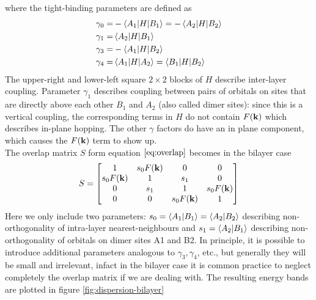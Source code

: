 where the tight-binding parameters are defined as 
\begin{equation}
    \begin{split}
        \gamma_0=&-\braket{A_1|H}{B_1}=-\braket{A_2|H}{B_2} \\
        \gamma_1=&\braket{A_2|H}{B_1}  \\
        \gamma_3=&-\braket{A_1|H}{B_2}  \\
        \gamma_4=& \braket{A_1|H}{A_2}=\braket{B_1|H}{B_2} \\
    \end{split}
\end{equation}
The upper-right and lower-left square $2\times 2$ blocks of $H$ describe inter-layer coupling. Parameter $\gamma_1$ describes coupling between pairs of orbitals on sites that are directly above each other $B_1$ and $A_2$ (also called dimer sites): since this is a vertical coupling, the corresponding terms in $H$ do not contain $F(\mathbf{k})$ which describes in-plane hopping. The other $\gamma$ factors do have an in plane component, which causes the $F(\mathbf{k})$ term to show up.\\
The overlap matrix $S$ form equation $\ref{eq:overlap}$ becomes in the bilayer case
\begin{equation}
    S=
    \begin{bmatrix}
        1 & s_0 F(\mathbf{k}) & 0&0\\
        s_0 F(\mathbf{k})  &1&s_1&0\\
        0&s_1&1&s_0 F(\mathbf{k})\\
        0&0&s_0 F(\mathbf{k}) &1
    \end{bmatrix}
\end{equation}
Here we only include two parameters: $s_0 = \braket{A_1}{B_1} = \braket{A_2}{B_2}$ describing non-orthogonality of intra-layer nearest-neighbours and $s_1= \braket{A_2}{B_1}$ describing non-orthogonality of orbitals on dimer sites A1 and B2. In principle, it is possible to introduce additional parameters analogous to $\gamma_3,\gamma_4$, etc., but generally they will be small and irrelevant, infact in the bilayer case it is common practice to neglect completely the overlap matrix if we are dealing with. The resulting energy bands are plotted in figure \ref{fig:dispersion-bilayer}

